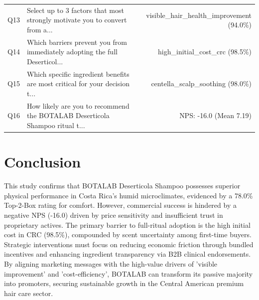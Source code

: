 \documentclass[10pt,twocolumn,a4paper]{article}
\begin{document}
\begin{table}[t]
\begin{tabularx}{\textwidth}{l X r}
Q13 & Select up to 3 factors that most strongly motivate you to convert from a... & visible\_hair\_health\_improvement (94.0\%) \\
Q14 & Which barriers prevent you from immediately adopting the full Deserticol... & high\_initial\_cost\_crc (98.5\%) \\
Q15 & Which specific ingredient benefits are most critical for your decision t... & centella\_scalp\_soothing (98.0\%) \\
Q16 & How likely are you to recommend the BOTALAB Deserticola Shampoo ritual t... & NPS: -16.0 (Mean 7.19) \\
\bottomrule
\end{tabularx}
\end{table}

\section{Conclusion}
This study confirms that BOTALAB Deserticola Shampoo possesses superior physical performance in Costa Rica’s humid microclimates, evidenced by a 78.0\% Top-2-Box rating for comfort. However, commercial success is hindered by a negative NPS (-16.0) driven by price sensitivity and insufficient trust in proprietary actives. The primary barrier to full-ritual adoption is the high initial cost in CRC (98.5\%), compounded by scent uncertainty among first-time buyers. Strategic interventions must focus on reducing economic friction through bundled incentives and enhancing ingredient transparency via B2B clinical endorsements. By aligning marketing messages with the high-value drivers of 'visible improvement' and 'cost-efficiency', BOTALAB can transform its passive majority into promoters, securing sustainable growth in the Central American premium hair care sector.
\end{document}
